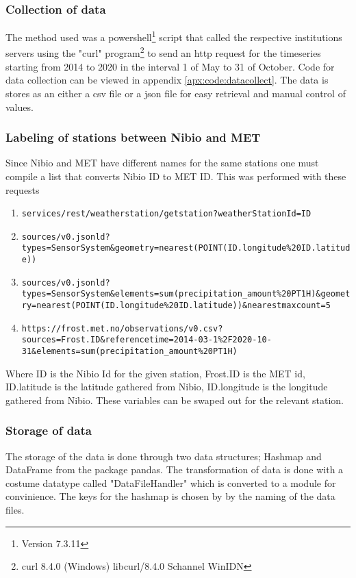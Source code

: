 \subsubsection{Collection of data}

The method used was a powershell\footnote{Version 7.3.11} script that called the respective institutions servers using the "curl" program\footnote{curl 8.4.0 (Windows) libcurl/8.4.0 Schannel WinIDN} to send an http request for the timeseries starting from 2014 to 2020 in the interval 1 of May to 31 of October. Code for data collection can be viewed in appendix \ref{apx:code:datacollect}. The data is stores as an either a csv file or a json file for easy retrieval and manual control of values.

\subsubsection{Labeling of stations between Nibio and MET}

Since Nibio and MET have different names for the same stations one must compile a list that converts Nibio ID to MET ID. This was performed with these requests 
\begin{enumerate}
	\item \verb"services/rest/weatherstation/getstation?weatherStationId=ID"
	\item \verb"sources/v0.jsonld?types=SensorSystem&geometry=nearest(POINT(ID.longitude%20ID.latitude))"
	\item \verb"sources/v0.jsonld?types=SensorSystem&elements=sum(precipitation_amount%20PT1H)&geometry=nearest(POINT(ID.longitude%20ID.latitude))&nearestmaxcount=5"
	\item \verb"https://frost.met.no/observations/v0.csv?sources=Frost.ID&referencetime=2014-03-1%2F2020-10-31&elements=sum(precipitation_amount%20PT1H)"
\end{enumerate}
Where ID is the Nibio Id for the given station, Frost.ID is the MET id, ID.latitude is the latitude gathered from Nibio, ID.longitude is the longitude gathered from Nibio. These variables can be swaped out for the relevant station.

\subsubsection{Storage of data}
The storage of the data is done through two data structures; Hashmap and DataFrame from the package pandas. The transformation of data is done with a costume datatype called "DataFileHandler" which is converted to a module for convinience. The keys for the hashmap is chosen by by the naming of the data files. 

